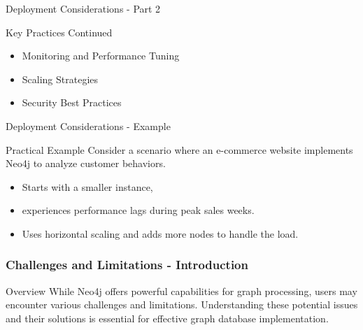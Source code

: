 \documentclass[aspectratio=169]{beamer}
\begin{document}
\begin{frame}[fragile]{Deployment Considerations - Part 2}
  \begin{block}{Key Practices Continued}
    \begin{itemize}
      \item Monitoring and Performance Tuning
      \item Scaling Strategies
      \item Security Best Practices
    \end{itemize}
  \end{block}
\end{frame}

\begin{frame}[fragile]{Deployment Considerations - Example}
  \begin{block}{Practical Example}
    Consider a scenario where an e-commerce website implements Neo4j to analyze customer behaviors. 
    \begin{itemize}
      \item Starts with a smaller instance, 
      \item experiences performance lags during peak sales weeks. 
      \item Uses horizontal scaling and adds more nodes to handle the load.
    \end{itemize}
  \end{block}
\end{frame}

\begin{frame}[fragile]
    \frametitle{Challenges and Limitations - Introduction}
    \begin{block}{Overview}
        While Neo4j offers powerful capabilities for graph processing, users may encounter various challenges and limitations. Understanding these potential issues and their solutions is essential for effective graph database implementation.
    \end{block}
\end{frame}
\end{document}
